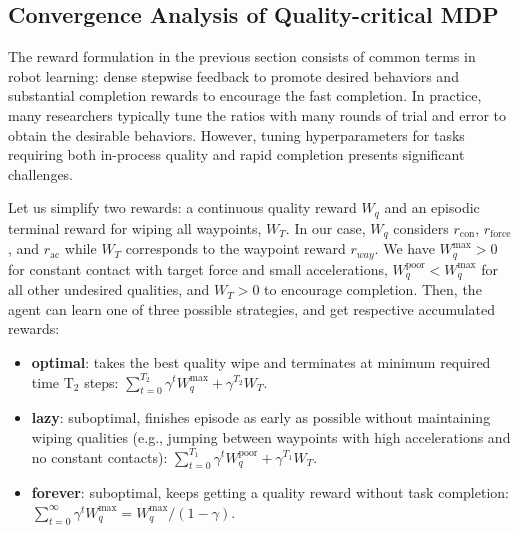 \subsection{Convergence Analysis of Quality-critical MDP} \label{sec:undesired-behavior}

The reward formulation in the previous section consists of common terms in robot learning: dense stepwise feedback to promote desired behaviors and substantial completion rewards to encourage the fast completion. In practice, many researchers typically tune the ratios with many rounds of trial and error to obtain the desirable behaviors. However, tuning hyperparameters for tasks requiring both in-process quality and rapid completion presents significant challenges.

Let us simplify two rewards: a continuous quality reward $W_q$ and an episodic terminal reward for wiping all waypoints, $W_T$. In our case, $W_q$ considers $r_{\text{con}}$, $r_{\text{force}}$, and $r_{\text{ac}}$ while $W_T$ corresponds to the waypoint reward $r_{way}$. We have $W_q^{\text{max}} > 0$ for constant contact with target force and small accelerations, $W_q^{\text{poor}} < W_q^{\text{max}}$ for all other undesired qualities, and $W_T > 0$ to encourage completion. Then, the agent can learn one of three possible strategies, and get respective accumulated rewards:


\begin{itemize}
    \item \textbf{optimal}: takes the best quality wipe and terminates at minimum required time $\text{T}_2$ steps: $\sum_{t=0}^{T_2} \gamma^t W_q^{\text{max}} + \gamma^{T_2} W_T$.
    \item \textbf{lazy}: suboptimal, finishes episode as early as possible without maintaining wiping qualities (e.g., jumping between waypoints with high accelerations and no constant contacts): $\sum_{t=0}^{T_1} \gamma^t W_q^{\text{poor}} + \gamma^{T_1} W_T$.
    \item \textbf{forever}: suboptimal, keeps getting a quality reward without task completion: $\sum_{t=0}^{\infty} \gamma^t W_q^{\text{max}} = W_q^{\text{max}}/(1-\gamma)$.
    
\end{itemize}


